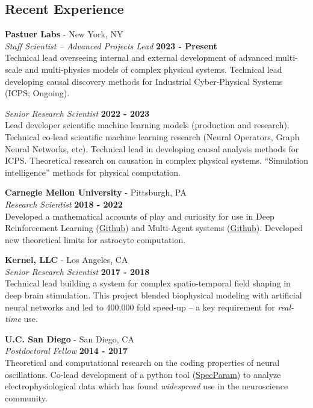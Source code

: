 \documentclass[margin,line]{res}
\begin{document}
\begin{resume}
\section{\sc Recent Experience}
\vspace{-.1cm}
{\bf Pastuer Labs} - New York, NY\\
{\em Staff Scientist -- Advanced Projects Lead} \hfill {\bf 2023 - Present}\\
Technical lead overseeing internal and external development of advanced multi-scale and multi-physics models of complex physical systems. Technical lead developing causal discovery methods for Industrial Cyber-Physical Systems (ICPS; Ongoing). 

\vspace{-.2cm}
{\em Senior Research Scientist} \hfill {\bf 2022 - 2023}\\
Lead developer scientific machine learning models (production and research). Technical co-lead scientific machine learning research (Neural Operators, Graph Neural Networks, etc). Technical lead in developing causal analysis methods for ICPS. Theoretical research on causation in complex physical systems. “Simulation intelligence” methods for physical computation.

\vspace{-.1cm}
{\bf Carnegie Mellon University} - Pittsburgh, PA \\
{\em Research Scientist} \hfill {\bf 2018 - 2022}\\
Developed a mathematical accounts of play and curiosity for use in Deep Reinforcement Learning (\href{https://github.com/CoAxLab/infomercial}{Github}) and Multi-Agent systems (\href{https://github.com/parenthetical-e/parkid}{Github}). Developed new theoretical limits for astrocyte computation. 

\vspace{-.1cm}
{\bf Kernel, LLC} - Los Angeles, CA\\
{\em Senior Research Scientist} \hfill {\bf 2017 - 2018}\\
Technical lead building a system for complex spatio-temporal field shaping in deep brain stimulation. This project blended biophysical modeling with artificial neural networks and led to 400,000 fold speed-up -- a key requirement for \emph{real-time} use.

\vspace{-.1cm}
{\bf U.C. San Diego} - San Diego, CA\\
{\em Postdoctoral Fellow} \hfill {\bf 2014 - 2017}\\
Theoretical and computational research on the coding properties of neural oscillations. Co-lead development of a python tool (\href{https://github.com/fooof-tools/fooof}{SpecParam}) to analyze electrophysiological data which has found \emph{widespread} use in the neuroscience community.


\end{resume}
\end{document}
